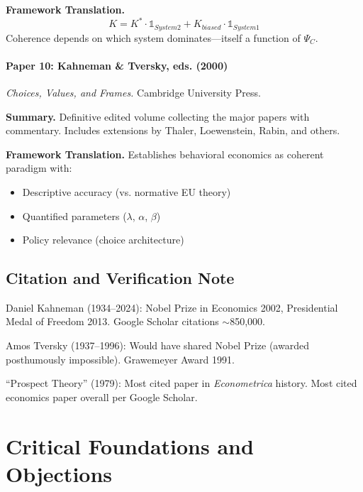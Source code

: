 \textbf{Framework Translation.}
\begin{equation}
K = K^* \cdot \mathbb{1}_{System2} + K_{biased} \cdot \mathbb{1}_{System1}
\end{equation}
Coherence depends on which system dominates—itself a function of $\Psi_C$.

\paragraph{Paper 10: Kahneman \& Tversky, eds. (2000)}

\textit{Choices, Values, and Frames.}
Cambridge University Press.

\textbf{Summary.}
Definitive edited volume collecting the major papers with commentary. 
Includes extensions by Thaler, Loewenstein, Rabin, and others.

\textbf{Framework Translation.}
Establishes behavioral economics as coherent paradigm with:
\begin{itemize}
    \item Descriptive accuracy (vs. normative EU theory)
    \item Quantified parameters ($\lambda$, $\alpha$, $\beta$)
    \item Policy relevance (choice architecture)
\end{itemize}

\subsection{Citation and Verification Note}

Daniel Kahneman (1934--2024): Nobel Prize in Economics 2002, Presidential Medal 
of Freedom 2013. Google Scholar citations $\sim$850,000.

Amos Tversky (1937--1996): Would have shared Nobel Prize (awarded posthumously 
impossible). Grawemeyer Award 1991.

``Prospect Theory'' (1979): Most cited paper in \textit{Econometrica} history.
Most cited economics paper overall per Google Scholar.




\section{Critical Foundations and Objections}
\label{sec:kth-foundations}

